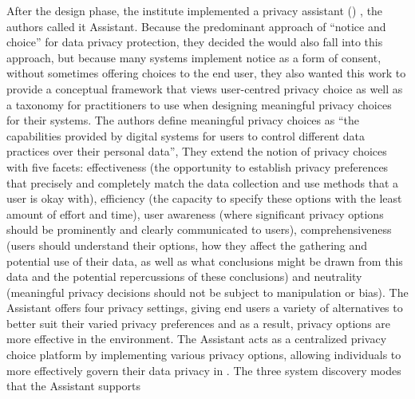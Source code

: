 After the design phase, the institute implemented a privacy assistant (\hyperlink{\acronym}{\acronym}) \cite{FengDesign},
the authors called it \hyperlink{\acronym}{\acronym} Assistant. Because the predominant approach of
``notice and choice'' for data privacy protection, they decided the \hyperlink{\acronym}{\acronym} would
also fall into this approach, but because many systems implement notice
as a form of consent, without sometimes offering choices to the end user,
they also wanted this work to provide a conceptual framework that views
user-centred privacy choice as well as a taxonomy for practitioners to
use when designing meaningful privacy choices for their systems. The authors
define meaningful privacy choices as ``the capabilities provided by digital
systems for users to control different data practices over their personal
data'', They extend the notion of privacy choices with five facets: effectiveness
(the opportunity to establish privacy preferences that precisely and completely
match the data collection and use methods that a user is okay with), efficiency
(the capacity to specify these options with the least amount of effort and
time), user awareness (where significant privacy options should be prominently
and clearly communicated to users), comprehensiveness (users should understand
their options, how they affect the gathering and potential use of their
data, as well as what conclusions might be drawn from this data and the
potential repercussions of these conclusions) and neutrality (meaningful
privacy decisions should not be subject to manipulation or bias). The \hyperlink{\acronym}{\acronym}
Assistant offers four privacy settings, giving end users a variety of alternatives
to better suit their varied privacy preferences and as a result, privacy
options are more effective in the \hyperlink{\acronym}{\acronym} environment. The \hyperlink{\acronym}{\acronym} Assistant acts
as a centralized privacy choice platform by implementing various privacy
options, allowing individuals to more effectively govern their data privacy
in \hyperlink{\acronym}{\acronym}. The three \hyperlink{\acronym}{\acronym} system discovery modes that the \hyperlink{\acronym}{\acronym} Assistant supports
